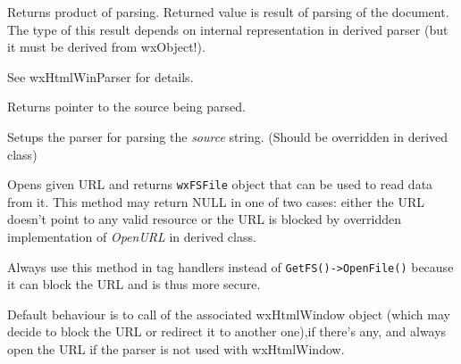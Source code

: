 \label{wxhtmlparsergetproduct}


Returns product of parsing. Returned value is result of parsing
of the document. The type of this result depends on internal
representation in derived parser (but it must be derived from wxObject!).

See wxHtmlWinParser for details.

\label{wxhtmlparsergetsource}


Returns pointer to the source being parsed.


\label{wxhtmlparserinitparser}


Setups the parser for parsing the {\it source} string. (Should be overridden
in derived class)

\label{wxhtmlparseropenurl}


Opens given URL and returns {\tt wxFSFile} object that can be used to read data
from it. This method may return NULL in one of two cases: either the URL doesn't
point to any valid resource or the URL is blocked by overridden implementation
of {\it OpenURL} in derived class.





Always use this method in tag handlers instead of {\tt GetFS()->OpenFile()} 
because it can block the URL and is thus more secure.

Default behaviour is to call 
of the associated wxHtmlWindow object (which may decide to block the URL or
redirect it to another one),if there's any, and always open the URL if the 
parser is not used with wxHtmlWindow.

